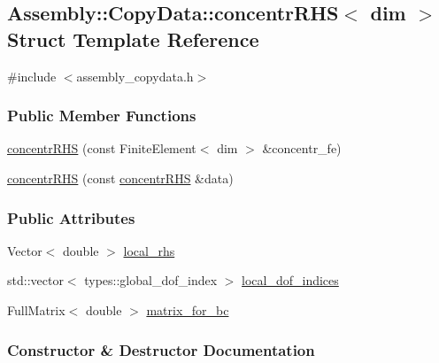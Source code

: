 \hypertarget{struct_assembly_1_1_copy_data_1_1concentr_r_h_s}{}\subsection{Assembly\+:\+:Copy\+Data\+:\+:concentr\+R\+H\+S$<$ dim $>$ Struct Template Reference}
\label{struct_assembly_1_1_copy_data_1_1concentr_r_h_s}


{\ttfamily \#include $<$assembly\+\_\+copydata.\+h$>$}

\subsubsection*{Public Member Functions}
\begin{DoxyCompactItemize}
\item 
\hyperlink{struct_assembly_1_1_copy_data_1_1concentr_r_h_s_adc0bbc1d0ab17592b775f1f3e10fce99}{concentr\+R\+H\+S} (const Finite\+Element$<$ dim $>$ \&concentr\+\_\+fe)
\item 
\hyperlink{struct_assembly_1_1_copy_data_1_1concentr_r_h_s_a28690ab676550d9de1b9b14f0c92e89b}{concentr\+R\+H\+S} (const \hyperlink{struct_assembly_1_1_copy_data_1_1concentr_r_h_s}{concentr\+R\+H\+S} \&data)
\end{DoxyCompactItemize}
\subsubsection*{Public Attributes}
\begin{DoxyCompactItemize}
\item 
Vector$<$ double $>$ \hyperlink{struct_assembly_1_1_copy_data_1_1concentr_r_h_s_aa16d978b90728b2e6118f642cd012d53}{local\+\_\+rhs}
\item 
std\+::vector$<$ types\+::global\+\_\+dof\+\_\+index $>$ \hyperlink{struct_assembly_1_1_copy_data_1_1concentr_r_h_s_a5e754dc8716eaebaeee1144ad1c59f16}{local\+\_\+dof\+\_\+indices}
\item 
Full\+Matrix$<$ double $>$ \hyperlink{struct_assembly_1_1_copy_data_1_1concentr_r_h_s_af68abcf2cce508ca241f8a57a4160b5d}{matrix\+\_\+for\+\_\+bc}
\end{DoxyCompactItemize}


\subsubsection{Constructor \& Destructor Documentation}
\hypertarget{struct_assembly_1_1_copy_data_1_1concentr_r_h_s_adc0bbc1d0ab17592b775f1f3e10fce99}{}

